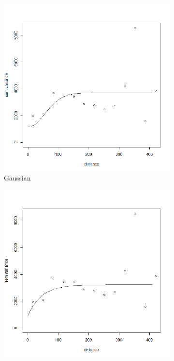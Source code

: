 \documentclass[12pt]{article}
\makeatletter
\theoremstyle{homework}
\newenvironment{exercise}[1]
{\def\@currentlabel{#1}\exercisecore}
{\endexercisecore}
\makeatother
\begin{document}
\begin{exercise}{2}
  \begin{figure}[H]
    \centering
    \caption{Eyefit() plots.}
    \begin{subfigure}[b]{0.45\textwidth}
        \centering
        \includegraphics[width=\textwidth]{Gaussian.png}
        \caption{Gaussian}
    \end{subfigure}
    \hfill
    \begin{subfigure}[b]{0.45\textwidth}
        \centering
        \includegraphics[width=\textwidth]{Exponential.png}

\end{subfigure}
\end{figure}
\end{exercise}
\end{document}

